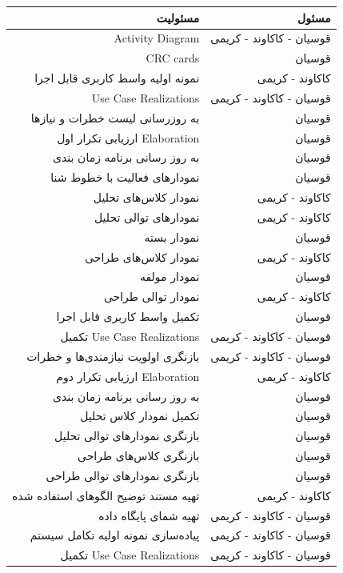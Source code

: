 \documentclass{article}
\begin{document}
\begin{tabular}{ | r | r | }
\hline
	مسئولیت & مسئول \\ \hline
	Activity Diagram &قوسیان - کاکاوند - کریمی \\ \hline
	CRC cards & قوسیان \\ \hline
	نمونه اولیه واسط کاربری قابل اجرا & کاکاوند - کریمی \\ \hline
	Use Case Realizations & قوسیان - کاکاوند - کریمی \\ \hline
	به روزرسانی لیست خطرات و نیازها & قوسیان \\ \hline
	ارزیابی تکرار اول Elaboration  & قوسیان \\ \hline
	به روز رسانی برنامه زمان بندی  & قوسیان \\ \hline
	نمودارهای فعالیت با خطوط شنا & قوسیان \\ \hline
	نمودار کلاس‌های تحلیل & کاکاوند - کریمی \\ \hline
	نمودارهای توالی تحلیل & کاکاوند - کریمی \\ \hline
	نمودار بسته & قوسیان \\ \hline
	نمودار کلاس‌های طراحی & کاکاوند - کریمی \\ \hline
	نمودار مولفه & قوسیان \\ \hline
	نمودار توالی طراحی & کاکاوند - کریمی \\ \hline
	تکمیل واسط کاربری قابل اجرا & قوسیان \\ \hline
	تکمیل Use Case Realizations & قوسیان - کاکاوند - کریمی \\ \hline
	بازنگری اولویت‌ نیازمندی‌ها و خطرات & قوسیان - کاکاوند - کریمی \\ \hline
	ارزیابی تکرار دوم Elaboration  & کاکاوند - کریمی \\ \hline
	به روز رسانی برنامه زمان بندی  & قوسیان \\ \hline
	تکمیل نمودار کلاس‌ تحلیل & قوسیان \\ \hline
	بازنگری نمودارهای توالی تحلیل & قوسیان \\ \hline
	بازنگری کلاس‌های طراحی & قوسیان \\ \hline
	بازنگری نمودارهای توالی طراحی & قوسیان \\ \hline
	تهیه مستند توضیح الگوهای استفاده شده & کاکاوند - کریمی \\ \hline
	تهیه شمای پایگاه داده & قوسیان - کاکاوند - کریمی \\ \hline
	پیاده‌سازی نمونه اولیه تکامل سیستم & قوسیان - کاکاوند - کریمی \\ \hline
	تکمیل Use Case Realizations & قوسیان - کاکاوند - کریمی \\ \hline

\end{tabular}
\end{document}
